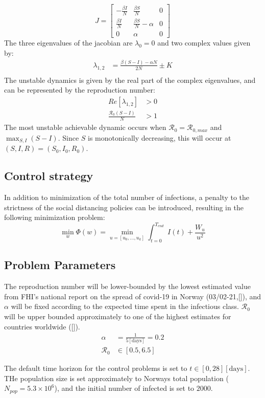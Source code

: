 \begin{equation}
    J = 
    \begin{bmatrix}
    -\frac{\beta I}{N} & \frac{\beta S}{N} & 0\\
    \frac{\beta I}{N} & \frac{\beta S}{N} - \alpha & 0 \\
    0 & \alpha & 0
    \end{bmatrix}
\end{equation}
The three eigenvalues of the jacobian are $\lambda_0 = 0$ and two complex values given by:
\begin{align}
    \lambda_{1,2} &= \frac{\beta(S-I)-\alpha N}{2N}  \pm K\\
\end{align}
The unstable dynamics is given by the real part of the complex eigenvalues, and can be represented by the reproduction number:
\begin{align}
    Re[\lambda_{1,2}] &> 0\\
    \frac{\mathscr{R}_0(S-I)}{N} &> 1
\end{align}
The most unstable achievable dynamic occurs when $\mathscr{R}_0 = \mathscr{R}_{0, max}$ and $\max_{S, I} (S-I)$. Since $S$ is monotonically decreasing, this will occur at $(S, I, R) = (S_0, I_0, R_0)$.

\subsection{Control strategy}
In addition to minimization of the total number of infections, a penalty to the strictness of the social distancing policies can be introduced, resulting in the following minimization problem:
\begin{equation}
    \min_{w} \Phi(w) = \min_{u = [u_0, \dots, u_k]} \int_{t=0}^{T_{end}} I(t) + \frac{W_u}{u^2}
\end{equation}

\subsection{Problem Parameters}
\label{ch:Problem_Parameters}
The reproduction number will be lower-bounded by the lowest estimated value from FHI's national report on the spread of covid-19 in Norway (03/02-21,[\cite{FHI_report}]), and $\alpha$ will be fixed according to the expected time spent in the infectious class. $\mathscr{R}_0$ will be upper bounded approximately to one of the highest estimates for countries worldwide ([\cite{France_high_R0}]).
\begin{align}
\alpha &= \frac{1}{5[\text{days}]} = 0.2\\
\mathscr{R}_0 &\in [0.5, 6.5]
\end{align}

The default time horizon for the control problems is set to $t \in [0, 28] [\text{days}]$. THe population size is set approximately to Norways total population ($N_{pop} = 5.3\times 10^6$), and the initial number of infected is set to $2000$. 

